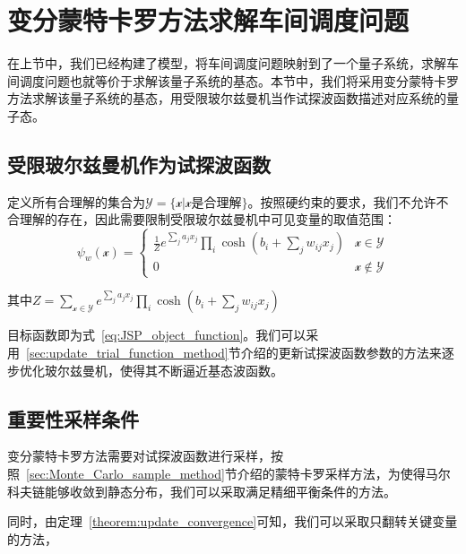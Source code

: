 \section{变分蒙特卡罗方法求解车间调度问题}
在上节中，我们已经构建了模型，将车间调度问题映射到了一个量子系统，求解车间调度问题也就等价于求解该量子系统的基态。本节中，我们将采用变分蒙特卡罗方法求解该量子系统的基态，用受限玻尔兹曼机当作试探波函数描述对应系统的量子态。
\subsection{受限玻尔兹曼机作为试探波函数}
定义所有合理解的集合为$\mathscr{Y}=\{\mathcal{x}|\mathcal{x}\text{是合理解}\}$。按照硬约束的要求，我们不允许不合理解的存在，因此需要限制受限玻尔兹曼机中可见变量的取值范围：
\begin{equation}
    \psi_{w}(\mathcal{x})=\begin{cases} \frac{1}{Z}e^{\sum_{j} a_{j} x_{j}} \prod_{i} \cosh \left(b_{i}+\sum_{j} w_{i j} x_{j}\right) & \mathcal{x}\in\mathscr{Y} \\ 0 & \mathcal{x}\notin\mathscr{Y} \end{cases}
\end{equation}

其中$Z=\sum\limits_{\mathcal{x}\in\mathscr{Y}}e^{\sum_{j} a_{j} x_{j}} \prod_{i} \cosh \left(b_{i}+\sum_{j} w_{i j} x_{j}\right)$

目标函数即为式~\eqref{eq:JSP_object_function}。我们可以采用~\ref{sec:update_trial_function_method}节介绍的更新试探波函数参数的方法来逐步优化玻尔兹曼机，使得其不断逼近基态波函数。
\subsection{重要性采样条件}
变分蒙特卡罗方法需要对试探波函数进行采样，按照~\ref{sec:Monte_Carlo_sample_method}节介绍的蒙特卡罗采样方法，为使得马尔科夫链能够收敛到静态分布，我们可以采取满足精细平衡条件的方法。

同时，由定理~\ref{theorem:update_convergence}可知，我们可以采取只翻转关键变量的方法，